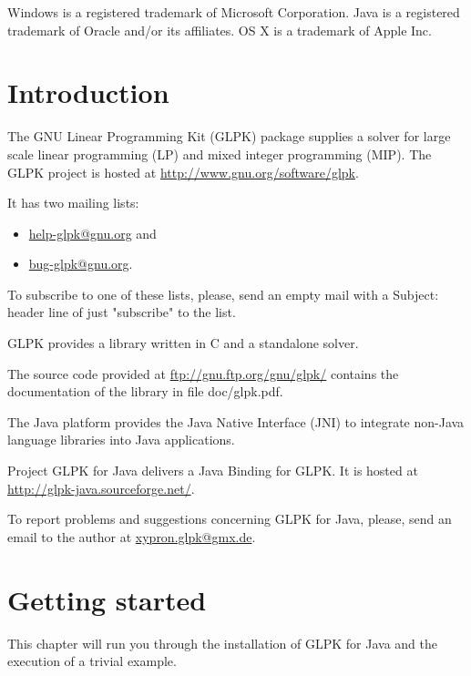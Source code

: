 \documentclass[a4paper,11pt]{report}
\begin{document}
\medskip \noindent
Windows is a registered trademark of Microsoft Corporation. 
Java is a registered trademark of Oracle and/or its affiliates.
OS X is a trademark of Apple Inc.

\tableofcontents

\chapter{Introduction}
The GNU Linear Programming Kit (GLPK)\cite{GLPK} package supplies a solver for
large scale linear programming (LP) and mixed integer programming (MIP). The
GLPK project is hosted at
\linebreak\href{http://www.gnu.org/software/glpk}{http://www.gnu.org/software/glpk}.

It has two mailing lists:
\begin{itemize}
\item\href{mailto:help-glpk@gnu.org}{help-glpk@gnu.org} and 
\item\href{mailto:bug-glpk@gnu.org}{bug-glpk@gnu.org}.
\end{itemize}
To subscribe to one of these lists, please, send an empty mail with a Subject:
header line of just "subscribe" to the list.

GLPK provides a library written in C and a standalone solver.

The source code provided at
\href{ftp://gnu.ftp.org/gnu/glpk/}{ftp://gnu.ftp.org/gnu/glpk/} contains the
documentation of the library in  file doc/glpk.pdf.

The Java platform provides the Java Native Interface (JNI)\cite{JNI} to
integrate non-Java language libraries into Java applications.

Project GLPK for Java delivers a Java Binding for GLPK. It is hosted at
\linebreak\href{http://glpk-java.sourceforge.net/}{http://glpk-java.sourceforge.net/}.

To report problems and suggestions concerning GLPK for Java, please, send an
email to the author at \href{mailto:xypron.glpk@gmx.de}{xypron.glpk@gmx.de}.

\chapter{Getting started}

This chapter will run you through the installation of GLPK for Java and the
execution of a trivial example.
\end{document}
